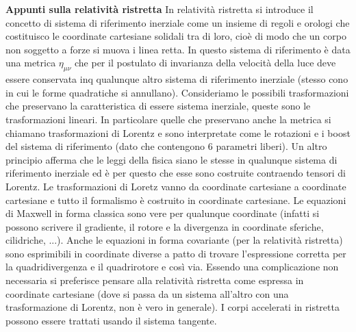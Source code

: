 \documentclass[10pt,a4paper]{article}
\begin{document}
\begin{itemize}
\textbf{Appunti sulla relatività ristretta}
In relatività ristretta si introduce il concetto di sistema di riferimento inerziale come un insieme di regoli e orologi che costituisco le coordinate cartesiane solidali tra di loro, cioè di modo che un corpo non soggetto a forze si muova i linea retta. In questo sistema di riferimento è data una metrica $\eta_{\mu \nu}$ che per il postulato di invarianza della velocità della luce deve essere conservata inq qualunque altro sistema di riferimento inerziale (stesso cono in cui le forme quadratiche si annullano). Consideriamo le possibili trasformazioni che preservano la caratteristica di essere sistema inerziale, queste sono le trasformazioni lineari. In particolare quelle che preservano anche la metrica si chiamano trasformazioni di Lorentz e sono interpretate come le rotazioni e i boost del sistema di riferimento (dato che contengono 6 parametri liberi). Un altro principio afferma che le leggi della fisica siano le stesse in qualunque sistema di riferimento inerziale ed è per questo che esse sono costruite contraendo tensori di Lorentz. 
Le trasformazioni di Loretz vanno da coordinate cartesiane a coordinate cartesiane e tutto il formalismo è costruito in coordinate cartesiane. Le equazioni di Maxwell in forma classica sono vere per qualunque coordinate (infatti si possono scrivere il gradiente, il rotore e la divergenza in coordinate sferiche, cilidriche, ...). Anche le equazioni in forma covariante (per la relatività ristretta) sono esprimibili in coordinate diverse a patto di trovare l'espressione corretta per la quadridivergenza e il quadrirotore e così via. Essendo una complicazione non necessaria si preferisce pensare alla relatività ristretta come espressa in coordinate cartesiane (dove si passa da un sistema all'altro con una trasformazione di Lorentz, non è vero in generale). I corpi accelerati in ristretta possono essere trattati usando il sistema tangente.

\end{itemize}
\end{document}
